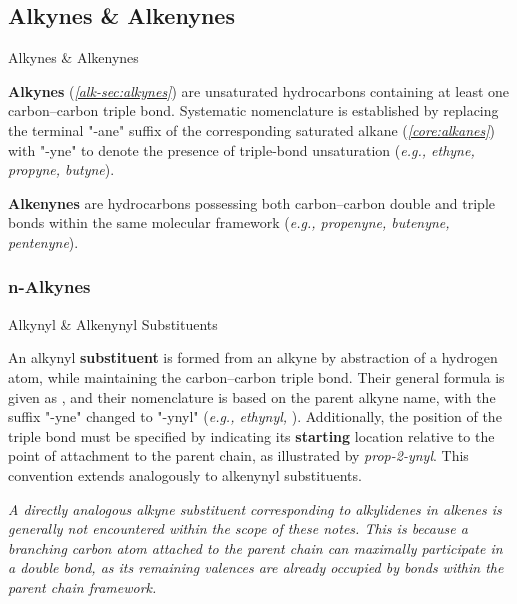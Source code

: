 \documentclass[10pt]{article}
\begin{document}
  \subsection{Alkynes \& Alkenynes}

    \begin{core}{Alkynes \& Alkenynes}

      \textbf{Alkynes} (\textit{\autoref{alk-sec:alkynes}}) are unsaturated hydrocarbons containing at least one carbon--carbon triple bond. Systematic nomenclature is established by replacing the terminal "-ane" suffix of the corresponding saturated alkane (\textit{\autoref{core:alkanes}}) with "-yne" to denote the presence of triple-bond unsaturation (\textit{e.g., ethyne, propyne, butyne}).

      \textbf{Alkenynes} are hydrocarbons possessing both carbon--carbon double and triple bonds within the same molecular framework (\textit{e.g., propenyne, butenyne, pentenyne}).

    \end{core}

    \subsubsection{n-Alkynes}

      \begin{core}{Alkynyl \& Alkenynyl Substituents}

        An alkynyl \textbf{substituent} is formed from an alkyne by abstraction of a hydrogen atom, while maintaining the carbon--carbon triple bond. Their general formula is given as , and their nomenclature is based on the parent alkyne name, with the suffix "-yne" changed to "-ynyl" (\textit{e.g., ethynyl, }). Additionally, the position of the triple bond must be specified by indicating its \textbf{starting} location relative to the point of attachment to the parent chain, as illustrated by \textit{prop-2-ynyl}. This convention extends analogously to alkenynyl substituents.
        
        \textit{A directly analogous alkyne substituent corresponding to alkylidenes in alkenes is generally not encountered within the scope of these notes. This is because a branching carbon atom attached to the parent chain can maximally participate in a double bond, as its remaining valences are already occupied by bonds within the parent chain framework.}


      \end{core}
\end{document}
